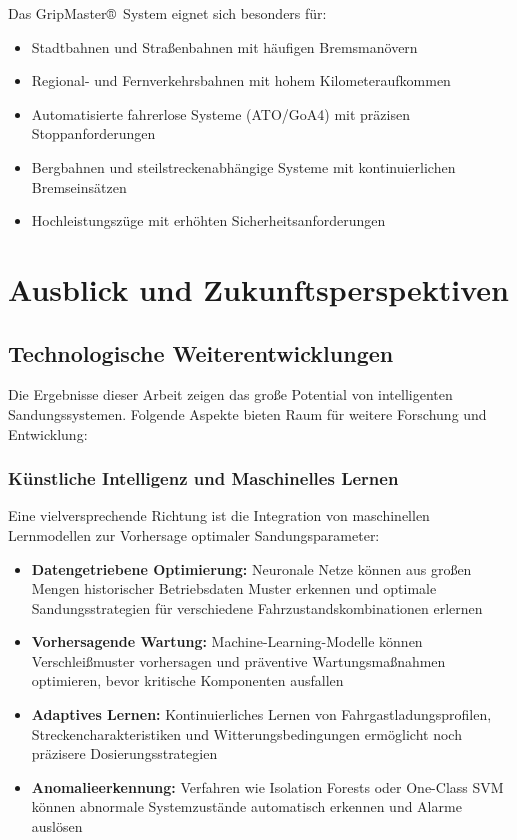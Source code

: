 \documentclass[a4paper,12pt]{article}
\theoremstyle{definition}
\theoremstyle{remark}
\begin{document}
Das GripMaster®~System eignet sich besonders für:
\begin{itemize}
	\item Stadtbahnen und Straßenbahnen mit häufigen Bremsmanövern
	\item Regional- und Fernverkehrsbahnen mit hohem Kilometeraufkommen
	\item Automatisierte fahrerlose Systeme (ATO/GoA4) mit präzisen Stoppanforderungen
	\item Bergbahnen und steilstreckenabhängige Systeme mit kontinuierlichen Bremseinsätzen
	\item Hochleistungszüge mit erhöhten Sicherheitsanforderungen
\end{itemize}

\section{Ausblick und Zukunftsperspektiven}

\subsection{Technologische Weiterentwicklungen}

Die Ergebnisse dieser Arbeit zeigen das große Potential von intelligenten Sandungssystemen. Folgende Aspekte bieten Raum für weitere Forschung und Entwicklung:

\subsubsection{Künstliche Intelligenz und Maschinelles Lernen}

Eine vielversprechende Richtung ist die Integration von maschinellen Lernmodellen zur Vorhersage optimaler Sandungsparameter:

\begin{itemize}
	\item \textbf{Datengetriebene Optimierung:} Neuronale Netze können aus großen Mengen historischer Betriebsdaten Muster erkennen und optimale Sandungsstrategien für verschiedene Fahrzustandskombinationen erlernen
	\item \textbf{Vorhersagende Wartung:} Machine-Learning-Modelle können Verschleißmuster vorhersagen und präventive Wartungsmaßnahmen optimieren, bevor kritische Komponenten ausfallen
	\item \textbf{Adaptives Lernen:} Kontinuierliches Lernen von Fahrgastladungsprofilen, Streckencharakteristiken und Witterungsbedingungen ermöglicht noch präzisere Dosierungsstrategien
	\item \textbf{Anomalieerkennung:} Verfahren wie Isolation Forests oder One-Class SVM können abnormale Systemzustände automatisch erkennen und Alarme auslösen
\end{itemize}
\end{document}
